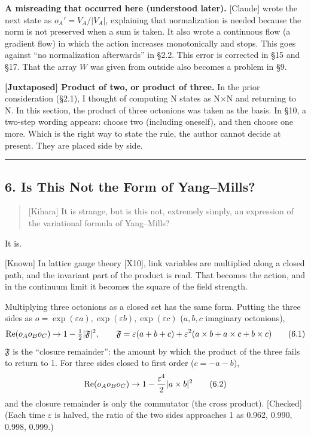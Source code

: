 \documentclass[
  a4paper,
]{article}
\begin{document}
\textbf{A misreading that occurred here (understood later).}
{[}Claude{]} wrote the next state as \(o_A' = V_A/\lvert V_A\rvert\),
explaining that normalization is needed because the norm is not
preserved when a sum is taken. It also wrote a continuous flow (a
gradient flow) in which the action increases monotonically and stops.
This goes against ``no normalization afterwards'' in §2.2. This error is
corrected in §15 and §17. That the array \(W\) was given from outside
also becomes a problem in §9.

\textbf{{[}Juxtaposed{]} Product of two, or product of three.} In the
prior consideration (§2.1), I thought of computing N states as N×N and
returning to N. In this section, the product of three octonions was
taken as the basis. In §10, a two-step wording appears: choose two
(including oneself), and then choose one more. Which is the right way to
state the rule, the author cannot decide at present. They are placed
side by side.

\begin{center}\rule{0.5\linewidth}{0.5pt}\end{center}

\subsection{6. Is This Not the Form of
Yang--Mills?}\label{is-this-not-the-form-of-yangmills}

\begin{quote}
{[}Kihara{]} It is strange, but is this not, extremely simply, an
expression of the variational formula of Yang--Mills?
\end{quote}

It is.

{[}Known{]} In lattice gauge theory {[}X10{]}, link variables are
multiplied along a closed path, and the invariant part of the product is
read. That becomes the action, and in the continuum limit it becomes the
square of the field strength.

Multiplying three octonions as a closed set has the same form. Putting
the three sides as
\(o = \exp(\varepsilon a), \exp(\varepsilon b), \exp(\varepsilon c)\)
(\(a, b, c\) imaginary octonions), \[
{\rm Re}(o_Ao_Bo_C) \to 1 - \tfrac12\lvert\mathfrak{F}\rvert^2,\qquad \mathfrak{F} = \varepsilon(a+b+c) + \varepsilon^2(a\times b + a\times c + b\times c) \tag{6.1}
\] \(\mathfrak{F}\) is the ``closure remainder'': the amount by which
the product of the three fails to return to 1. For three sides closed to
first order (\(c = -a-b\)), \[
{\rm Re}(o_Ao_Bo_C) \to 1 - \frac{\varepsilon^4}{2}\lvert a\times b\rvert^2 \tag{6.2}
\] and the closure remainder is only the commutator (the cross product).
{[}Checked{]} (Each time \(\varepsilon\) is halved, the ratio of the two
sides approaches 1 as 0.962, 0.990, 0.998, 0.999.)
\end{document}
